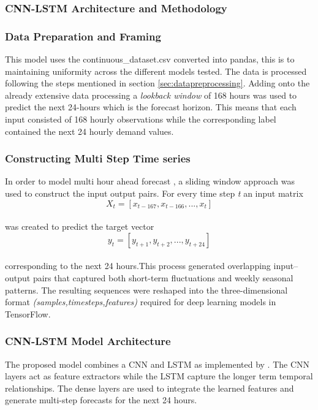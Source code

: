 \subsubsection{CNN-LSTM Architecture and Methodology}

\subsubsection{Data Preparation and Framing}
This model uses the continuous\_dataset.csv converted into pandas, this is to maintaining uniformity across the different models tested. The data is processed following the steps mentioned in section \ref{sec:datapreprocessing}. Adding onto the already extensive data processing a \textit{lookback window} of 168 hours was used to predict the next 24-hours which is the forecast horizon. This means that each input consisted of 168 hourly observations while the corresponding label contained the next 24 hourly demand values.

\subsubsection{Constructing Multi Step Time series}
In order to model multi hour ahead forecast , a sliding window approach was used to construct the input output pairs. For every time step \textit{t} an input matrix\\ \[
X_t =[x_{t-167},x_{t-166}, ... , x_t]
\] \\
 was created to predict the target vector \\
 \[
 y_t = [y_{t+1},y_{t+2}, ... , y_{t+24}] 
 \]
\\ corresponding to the next 24 hours.This process generated overlapping input–output pairs that captured both short-term fluctuations and weekly seasonal patterns. The resulting sequences were reshaped into the three-dimensional format 
\textit{(samples,timesteps,features)} required for deep learning models in TensorFlow.
\subsubsection{CNN-LSTM Model Architecture}
The proposed model combines a CNN and LSTM as implemented by \cite{rafi2021short}. The CNN layers act as feature extractors while the LSTM capture the longer term temporal relationships. The dense layers are used to integrate the learned features and generate multi-step forecasts for the next 24 hours.

